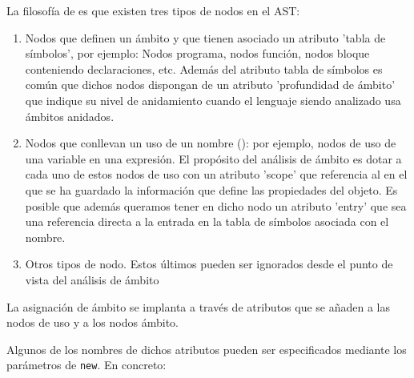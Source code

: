La filosofía de  es que existen tres tipos de nodos en el AST:
\begin{enumerate}
\item Nodos que definen un ámbito y que tienen asociado un atributo 'tabla de símbolos', 
por ejemplo: Nodos programa, nodos función, nodos bloque conteniendo
declaraciones, etc. Además del atributo tabla de símbolos es común que dichos nodos
dispongan de un atributo 'profundidad de ámbito' que indique su nivel de anidamiento cuando el
lenguaje siendo analizado usa ámbitos anidados.

\item Nodos que conllevan un uso de un nombre (): 
por ejemplo, nodos de uso de una variable en una
expresión. El propósito del análisis de ámbito es dotar a cada uno de estos nodos de uso con
un atributo 'scope' que referencia al  en el que se ha guardado
la información que define las propiedades del objeto. Es posible que además
queramos tener en dicho nodo un atributo 'entry' que sea una referencia
directa a la entrada en la tabla de símbolos asociada con el nombre.

\item Otros tipos de nodo. Estos últimos pueden ser ignorados desde el 
punto de vista del análisis de ámbito
\end{enumerate}

La asignación de ámbito se implanta 
a través de atributos que se añaden a las nodos de uso y a los nodos ámbito.

Algunos de los nombres de dichos atributos pueden ser especificados mediante los parámetros 
de \verb|new|. En concreto:

